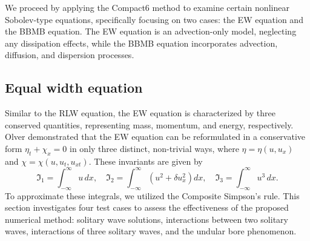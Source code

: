 \documentclass[11pt,a4paper]{amsart}
\theoremstyle{plain}
\theoremstyle{definition}
\theoremstyle{remark}
\numberwithin{equation}{section}
\begin{document}
\par
We proceed by applying the Compact6 method to examine certain nonlinear Sobolev-type equations, specifically focusing on two cases: the EW equation and the BBMB equation. The EW equation is an advection-only model, neglecting any dissipation effects, while the BBMB equation incorporates advection, diffusion, and dispersion processes.
\subsection{Equal width equation}
Similar to the RLW equation, the EW equation is characterized by three conserved quantities, representing mass, momentum, and energy, respectively. Olver \cite{olver1979euler} demonstrated that the EW equation can be reformulated in a conservative form $\eta_t + \chi_x = 0$ in only three distinct, non-trivial ways, where $\eta = \eta(u, u_x)$ and $\chi = \chi(u, u_t, u_{xt})$. These invariants are given by
\begin{equation}\label{Invariants}
    \mathfrak{I}_1 = \int_{-\infty}^{\infty} u \, dx, \quad \mathfrak{I}_2 = \int_{-\infty}^{\infty} \left( u^2 + \delta u_x^2 \right) dx, \quad \mathfrak{I}_3 = \int_{-\infty}^{\infty} u^3 \, dx.
\end{equation}
To approximate these integrals, we utilized the Composite Simpson’s rule. This section investigates four test cases to assess the effectiveness of the proposed numerical method: solitary wave solutions, interactions between two solitary waves, interactions of three solitary waves, and the undular bore phenomenon.
\end{document}
